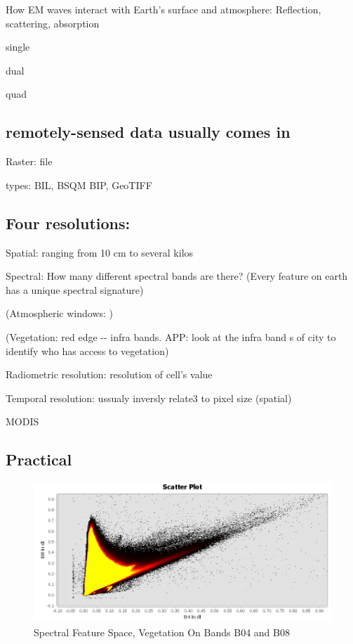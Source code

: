 \documentclass[
  letterpaper,
  DIV=11,
  numbers=noendperiod]{scrreprt}
\begin{document}
How EM waves interact with Earth's surface and atmosphere: Reflection,
scattering, absorption

single

dual

quad

\hypertarget{remotely-sensed-data-usually-comes-in}{%
\subsection{remotely-sensed data usually comes
in}\label{remotely-sensed-data-usually-comes-in}}

Raster: file

types: BIL, BSQM BIP, GeoTIFF

\hypertarget{four-resolutions}{%
\subsection{Four resolutions:}\label{four-resolutions}}

Spatial: ranging from 10 cm to several kilos

Spectral: How many different spectral bands are there? (Every feature on
earth has a unique spectral signature)

(Atmospheric windows: )

(Vegetation: red edge -\/- infra bands. APP: look at the infra band s of
city to identify who has access to vegetation)

Radiometric resolution: resolution of cell's value

Temporal resolution: ussualy inversly relate3 to pixel size (spatial)

MODIS

\hypertarget{practical}{%
\subsection{Practical}\label{practical}}

\begin{figure}

{\centering \includegraphics{./images/spectral_feature_space_vege_B04_B08.png}

}

\caption{\label{fig-vege}Spectral Feature Space, Vegetation On Bands B04
and B08}

\end{figure}
\end{document}
